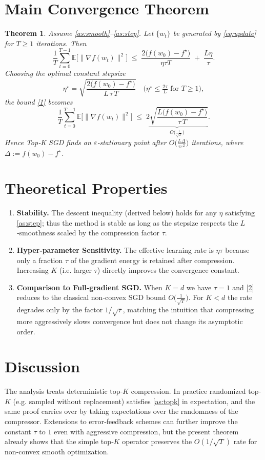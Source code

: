 \documentclass{article}
\newtheorem{theorem}{Theorem}
\newcommand{\E}{\mathbb{E}}
\begin{document}
\section*{Main Convergence Theorem}
\begin{theorem}\label{thm:main}
Assume \ref{as:smooth}–\ref{as:step}. Let $\{w_{t}\}$ be generated by
\eqref{eq:update} for $T\ge1$ iterations. Then
\[
\frac{1}{T}\sum_{t=0}^{T-1}\E\!\bigl[\|\nabla f(w_{t})\|^{2}\bigr]
\;\le\;
\frac{2\bigl(f(w_{0})-f^{\star}\bigr)}{\eta\tau T}
\;+\;
\frac{L\eta}{\tau}.
\tag{1}
\]
Choosing the optimal constant stepsize
\[
\eta^{\star}= \sqrt{\frac{2\bigl(f(w_{0})-f^{\star}\bigr)}{L\,\tau\,T}}
\quad\bigl(\eta^{\star}\le \tfrac{2\tau}{L}\text{ for }T\ge1\bigr),
\]
the bound \eqref{1} becomes
\[
\frac{1}{T}\sum_{t=0}^{T-1}\E\!\bigl[\|\nabla f(w_{t})\|^{2}\bigr]
\;\le\;
\underbrace{2\sqrt{\frac{L\bigl(f(w_{0})-f^{\star}\bigr)}{\tau\,T}}}_{\displaystyle O\!\bigl(\tfrac{1}{\sqrt{T}}\bigr)} .
\tag{2}
\]
Hence Top‑K SGD finds an $\varepsilon$‑stationary point after
$O\!\bigl(\tfrac{L\Delta}{\tau\varepsilon^{2}}\bigr)$ iterations,
where $\Delta:=f(w_{0})-f^{\star}$.
\end{theorem}

\section*{Theoretical Properties}
\begin{enumerate}[label=\arabic*.]
\item \textbf{Stability.} The descent inequality (derived below) holds for any
$\eta$ satisfying \ref{as:step}; thus the method is stable as long as the
stepsize respects the $L$‑smoothness scaled by the compression factor $\tau$.
\item \textbf{Hyper‑parameter Sensitivity.}
The effective learning rate is $\eta\tau$ because only a fraction $\tau$ of the
gradient energy is retained after compression. Increasing $K$ (i.e. larger $\tau$)
directly improves the convergence constant.
\item \textbf{Comparison to Full‑gradient SGD.}
When $K=d$ we have $\tau=1$ and \eqref{2} reduces to the classical
non‑convex SGD bound $O\!\bigl(\tfrac{1}{\sqrt{T}}\bigr)$. For $K<d$ the rate
degrades only by the factor $1/\sqrt{\tau}$, matching the intuition that
compressing more aggressively slows convergence but does not change its
asymptotic order.
\end{enumerate}

\section*{Discussion}
The analysis treats deterministic top‑$K$ compression. In practice
randomized top‑$K$ (e.g. sampled without replacement) satisfies
\ref{as:topk} in expectation, and the same proof carries over by taking
expectations over the randomness of the compressor. Extensions to
error‑feedback schemes can further improve the constant $\tau$ to $1$ even
with aggressive compression, but the present theorem already shows that
the simple top‑$K$ operator preserves the $O(1/\sqrt{T})$ rate for non‑convex
smooth optimization.
\end{document}
